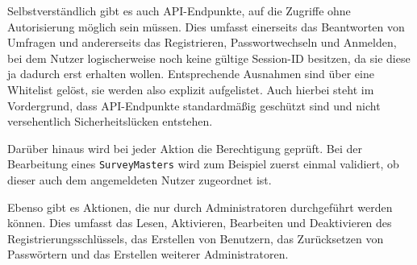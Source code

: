 Selbstverständlich gibt es auch \acs{API}-Endpunkte, auf die Zugriffe ohne Autorisierung möglich sein müssen.
Dies umfasst einerseits das Beantworten von Umfragen und andererseits das Registrieren, Passwortwechseln und Anmelden, bei dem Nutzer logischerweise noch keine gültige Session-ID besitzen, da sie diese ja dadurch erst erhalten wollen.
Entsprechende Ausnahmen sind über eine Whitelist gelöst, sie werden also explizit aufgelistet.
Auch hierbei steht im Vordergrund, dass \acs{API}-Endpunkte standardmäßig geschützt sind und nicht versehentlich Sicherheitslücken entstehen.

Darüber hinaus wird bei jeder Aktion die Berechtigung geprüft.
Bei der Bearbeitung eines \texttt{SurveyMasters} wird zum Beispiel zuerst einmal validiert, ob dieser auch dem angemeldeten Nutzer zugeordnet ist.

Ebenso gibt es Aktionen, die nur durch Administratoren durchgeführt werden können.
Dies umfasst das Lesen, Aktivieren, Bearbeiten und Deaktivieren des Registrierungsschlüssels, das Erstellen von Benutzern, das Zurücksetzen von Passwörtern und das Erstellen weiterer Administratoren.
